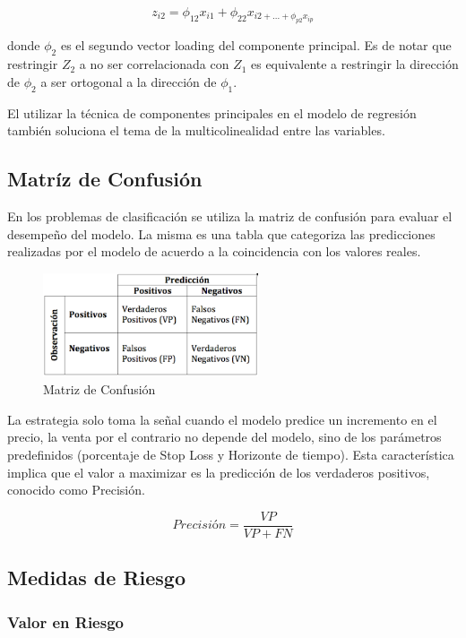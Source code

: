 \documentclass[a4paper,12pt]{Latex/Classes/PhDthesisPSnPDF}
\begin{document}
$$ z_{i2} = \phi_{12}x_{i1} + \phi_{22}x_{i2 + ... + \phi_{p2}x_{ip}} $$

donde $\phi_{2}$ es el segundo vector loading del componente principal. Es de notar que restringir $Z_{2}$ a no ser correlacionada con $Z_{1}$ es equivalente a restringir la dirección de $\phi_{2}$ a ser ortogonal a la dirección de $\phi_{1}$.

El utilizar la técnica de componentes principales en el modelo de regresión también soluciona el tema de la multicolinealidad entre las variables. 

\subsection{Matríz de Confusión}

En los problemas de clasificación se utiliza la matriz de confusión para evaluar el desempeño del modelo. La misma es una tabla que categoriza las predicciones realizadas por el modelo de acuerdo a la coincidencia con los valores reales. 

\begin{figure}[ht]
\begin{center}
\includegraphics[width=2.5in]{images/confusion_matrix}
\end{center}
\caption{Matriz de Confusión}
\end{figure}

La estrategia solo toma la señal cuando el modelo predice un incremento en el precio, la venta por el contrario no depende del modelo, sino de los parámetros predefinidos (porcentaje de Stop Loss y Horizonte de tiempo). Esta característica implica que el valor a maximizar es la predicción de los verdaderos positivos, conocido como Precisión.

$$ Precisión = \frac{VP}{VP + FN} $$

\subsection{Medidas de Riesgo}

\subsubsection{Valor en Riesgo}
\end{document}
